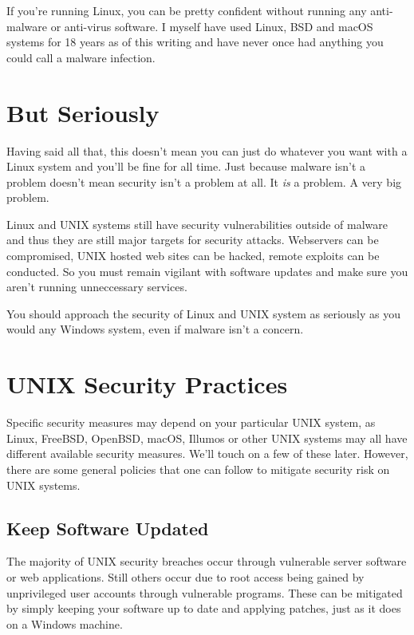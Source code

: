 If you're running Linux, you can be pretty confident without running any anti-malware or anti-virus software.  I myself have used Linux, BSD and macOS systems for 18 years as of this writing and have never once had anything you could call a malware infection.

\section{But Seriously}

Having said all that, this doesn't mean you can just do whatever you want with a Linux system and you'll be fine for all time.  Just because malware isn't a problem doesn't mean security isn't a problem at all. It \textit{is} a problem.  A very big problem. 

Linux and UNIX systems still have security vulnerabilities outside of malware and thus they are still major targets for security attacks.  Webservers can be compromised, UNIX hosted web sites can be hacked, remote exploits can be conducted.  So you must remain vigilant with software updates and make sure you aren't running unneccessary services.

You should approach the security of Linux and UNIX system as seriously as you would any Windows system, even if malware isn't a concern.

\section{UNIX Security Practices}

Specific security measures may depend on your particular UNIX system, as Linux, FreeBSD, OpenBSD, macOS, Illumos or other UNIX systems may all have different available security measures. We'll touch on a few of these later.  However, there are some general policies that one can follow to mitigate security risk on UNIX systems.

\subsection{Keep Software Updated}

The majority of UNIX security breaches occur through vulnerable server software or web applications.  Still others occur due to root access being gained by unprivileged user accounts through vulnerable programs.  These can be mitigated by simply keeping your software up to date and applying patches, just as it does on a Windows machine.

